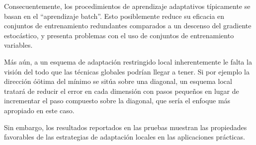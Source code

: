 Consecuentemente, los procedimientos de aprendizaje adaptativos
típicamente se basan en el ``aprendizaje batch''. Esto posiblemente
reduce su eficacia en conjuntos de entrenamiento redundantes
comparados a un descenso del gradiente estocástico, y presenta
problemas con el uso de conjuntos de entrenamiento variables.

Más aún, a un esquema de adaptación restringido local inherentemente le
falta la visión del todo que las técnicas globales podrían llegar a
tener. Si por ejemplo la dirección óötima del mínimo se sitúa sobre
una diagonal, un esquema local tratará de reducir el error en cada
dimensión con pasos pequeños en lugar de incrementar el paso compuesto
sobre la diagonal, que sería el enfoque más apropiado en este caso.

Sin embargo, los resultados reportados en las pruebas
\cite{riedmiller} muestran las propiedades favorables de las
estrategias de adaptación locales en las aplicaciones prácticas.
